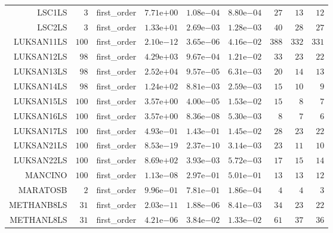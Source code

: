 \begin{longtable}{rrrrrrrrr}
LSC1LS & \(     3\) & first\_order & \( 7.71\)e\(+00\) & \( 1.08\)e\(-04\) & \( 8.80\)e\(-04\) & \(    27\) & \(    13\) & \(    12\) \\
LSC2LS & \(     3\) & first\_order & \( 1.33\)e\(+01\) & \( 2.69\)e\(-03\) & \( 1.28\)e\(-03\) & \(    40\) & \(    28\) & \(    27\) \\
LUKSAN11LS & \(   100\) & first\_order & \( 2.10\)e\(-12\) & \( 3.65\)e\(-06\) & \( 4.16\)e\(-02\) & \(   388\) & \(   332\) & \(   331\) \\
LUKSAN12LS & \(    98\) & first\_order & \( 4.29\)e\(+03\) & \( 9.67\)e\(-04\) & \( 1.21\)e\(-02\) & \(    33\) & \(    23\) & \(    22\) \\
LUKSAN13LS & \(    98\) & first\_order & \( 2.52\)e\(+04\) & \( 9.57\)e\(-05\) & \( 6.31\)e\(-03\) & \(    20\) & \(    14\) & \(    13\) \\
LUKSAN14LS & \(    98\) & first\_order & \( 1.24\)e\(+02\) & \( 8.81\)e\(-03\) & \( 2.59\)e\(-03\) & \(    15\) & \(    10\) & \(     9\) \\
LUKSAN15LS & \(   100\) & first\_order & \( 3.57\)e\(+00\) & \( 4.00\)e\(-05\) & \( 1.53\)e\(-02\) & \(    15\) & \(     8\) & \(     7\) \\
LUKSAN16LS & \(   100\) & first\_order & \( 3.57\)e\(+00\) & \( 8.36\)e\(-08\) & \( 5.30\)e\(-03\) & \(     8\) & \(     7\) & \(     6\) \\
LUKSAN17LS & \(   100\) & first\_order & \( 4.93\)e\(-01\) & \( 1.43\)e\(-01\) & \( 1.45\)e\(-02\) & \(    28\) & \(    23\) & \(    22\) \\
LUKSAN21LS & \(   100\) & first\_order & \( 8.53\)e\(-19\) & \( 2.37\)e\(-10\) & \( 3.14\)e\(-03\) & \(    23\) & \(    11\) & \(    10\) \\
LUKSAN22LS & \(   100\) & first\_order & \( 8.69\)e\(+02\) & \( 3.93\)e\(-03\) & \( 5.72\)e\(-03\) & \(    17\) & \(    15\) & \(    14\) \\
MANCINO & \(   100\) & first\_order & \( 1.13\)e\(-08\) & \( 2.97\)e\(-01\) & \( 5.01\)e\(-01\) & \(    13\) & \(    13\) & \(    12\) \\
MARATOSB & \(     2\) & first\_order & \( 9.96\)e\(-01\) & \( 7.81\)e\(-01\) & \( 1.86\)e\(-04\) & \(     4\) & \(     4\) & \(     3\) \\
METHANB8LS & \(    31\) & first\_order & \( 2.03\)e\(-11\) & \( 1.88\)e\(-06\) & \( 8.41\)e\(-03\) & \(    34\) & \(    23\) & \(    22\) \\
METHANL8LS & \(    31\) & first\_order & \( 4.21\)e\(-06\) & \( 3.84\)e\(-02\) & \( 1.33\)e\(-02\) & \(    61\) & \(    37\) & \(    36\) \\

\end{longtable}
